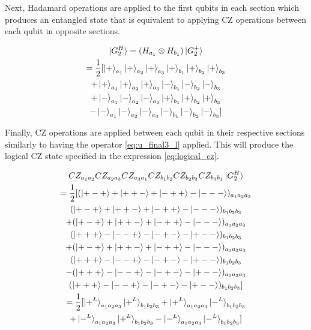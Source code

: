 Next, Hadamard operations are applied to the first qubits in each section which produces an entangled state that is equivalent to applying CZ operations between each qubit in opposite sections.

\begin{multline}
\label{eq:G_states}
\ket{G^{H}_{2}} = (H_{a_{1}} \otimes H_{b_{1}}) \ket{G^{+}_{2}} \\
= \frac{1}{2} [\ket{+}_{a_{1}}\ket{+}_{a_{2}}\ket{+}_{a_{3}}\ket{+}_{b_{1}}\ket{+}_{b_{2}}\ket{+}_{b_{3}} \\
+ \ket{+}_{a_{1}}\ket{+}_{a_{2}}\ket{+}_{a_{3}}\ket{-}_{b_{1}}\ket{-}_{b_{2}}\ket{-}_{b_{3}} \\
+ \ket{-}_{a_{1}}\ket{-}_{a_{2}}\ket{-}_{a_{3}}\ket{+}_{b_{1}}\ket{+}_{b_{2}}\ket{+}_{b_{3}} \\
- \ket{-}_{a_{1}}\ket{-}_{a_{2}}\ket{-}_{a_{3}}\ket{-}_{b_{1}}\ket{-}_{b_{2}}\ket{-}_{b_{3}}] \\
\end{multline}

Finally, CZ operations are applied between each qubit in their respective sections similarly to having the operator \eqref{eq:u_final3_l} applied. This will produce the logical CZ state specified in the expression \eqref{eq:logical_cz}.

\begin{multline}
\label{eq:add_triangle_cz}
CZ_{a_{1}a_{2}} CZ_{a_{2}a_{3}} CZ_{a_{3}a_{1}} CZ_{b_{1}b_{2}} CZ_{b_{2}b_{3}} CZ_{b_{3}b_{1}} \ket{G^{H}_{2}} \\
= \frac{1}{2} [(\ket{+-+} +\ket{++-} + \ket{-++} - \ket{---})_{a_{1}a_{2}a_{3}} \\
(\ket{+-+} +\ket{++-} + \ket{-++} - \ket{---})_{b_{1}b_{2}b_{3}} \\
+ (\ket{+-+} +\ket{++-} + \ket{-++} - \ket{---})_{a_{1}a_{2}a_{3}} \\
(\ket{+++} - \ket{--+} - \ket{-+-} - \ket{+--})_{b_{1}b_{2}b_{3}} \\
+ (\ket{+-+} +\ket{++-} + \ket{-++} - \ket{---})_{a_{1}a_{2}a_{3}} \\
(\ket{+++} - \ket{--+} - \ket{-+-} - \ket{+--})_{b_{1}b_{2}b_{3}} \\
- (\ket{+++} - \ket{--+} - \ket{-+-} - \ket{+--})_{a_{1}a_{2}a_{3}} \\
(\ket{+++} - \ket{--+} - \ket{-+-} - \ket{+--})_{b_{1}b_{2}b_{3}}] \\
= \frac{1}{2} [\ket{+^{L}}_{a_{1}a_{2}a_{3}} \ket{+^{L}}_{b_{1}b_{2}b_{3}} + \ket{+^{L}}_{a_{1}a_{2}a_{3}} \ket{-^{L}}_{b_{1}b_{2}b_{3}} \\
+ \ket{-^{L}}_{a_{1}a_{2}a_{3}} \ket{+^{L}}_{b_{1}b_{2}b_{3}} - \ket{-^{L}}_{a_{1}a_{2}a_{3}} \ket{-^{L}}_{b_{1}b_{2}b_{3}}] \\
\end{multline}

